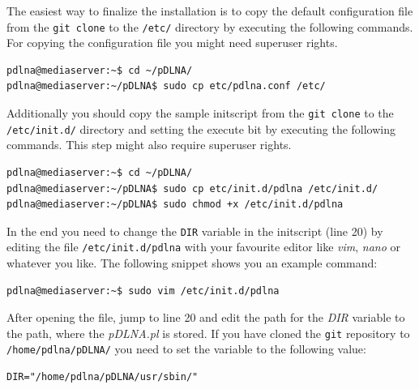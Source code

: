 \documentclass[a4paper,oneside,10pt]{report}
\newenvironment{colframefile}{%
  \begin{Sbox}
    \begin{minipage}{.99\columnwidth}
}{%
  \end{minipage}
  \end{Sbox}
  \begin{center}
    \fcolorbox{black}{Yellow}{\TheSbox}
  \end{center}
}
\begin{document}
The easiest way to finalize the installation is to copy the default configuration file from the \verb|git clone| to the \verb|/etc/| directory by executing the following commands. For copying the configuration file you might need superuser rights.
\begin{lstlisting}
pdlna@mediaserver:~$ cd ~/pDLNA/
pdlna@mediaserver:~/pDLNA$ sudo cp etc/pdlna.conf /etc/
\end{lstlisting}
Additionally you should copy the sample initscript from the \verb|git clone| to the \verb|/etc/init.d/| directory and setting the execute bit by executing the following commands. This step might also require superuser rights.
\begin{lstlisting}
pdlna@mediaserver:~$ cd ~/pDLNA/
pdlna@mediaserver:~/pDLNA$ sudo cp etc/init.d/pdlna /etc/init.d/
pdlna@mediaserver:~/pDLNA$ sudo chmod +x /etc/init.d/pdlna
\end{lstlisting}
In the end you need to change the \verb|DIR| variable in the initscript (line 20) by editing the file \verb|/etc/init.d/pdlna| with your favourite editor like {\em vim}, {\em nano} or whatever you like. The following snippet shows you an example command:
\begin{lstlisting}
pdlna@mediaserver:~$ sudo vim /etc/init.d/pdlna
\end{lstlisting}
After opening the file, jump to line 20 and edit the path for the {\em DIR} variable to the path, where the {\em pDLNA.pl} is stored. If you have cloned the \verb|git| repository to \verb|/home/pdlna/pDLNA/| you need to set the variable to the following value:
\begin{colframefile}
\begin{verbatim}
DIR="/home/pdlna/pDLNA/usr/sbin/"
\end{verbatim}
\end{colframefile}
\end{document}
